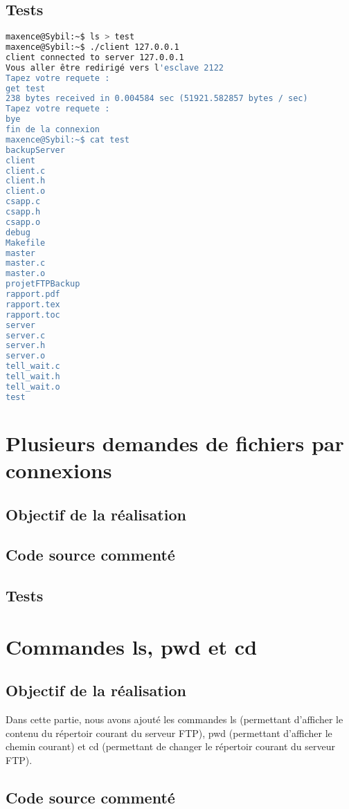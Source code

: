 \documentclass{report}
\begin{document}
      \section{Tests}
\begin{lstlisting}[frame=single,basicstyle=\footnotesize,language=bash]
maxence@Sybil:~$ ls > test
maxence@Sybil:~$ ./client 127.0.0.1
client connected to server 127.0.0.1
Vous aller être redirigé vers l'esclave 2122
Tapez votre requete :
get test
238 bytes received in 0.004584 sec (51921.582857 bytes / sec)
Tapez votre requete :
bye
fin de la connexion
maxence@Sybil:~$ cat test
backupServer
client
client.c
client.h
client.o
csapp.c
csapp.h
csapp.o
debug
Makefile
master
master.c
master.o
projetFTPBackup
rapport.pdf
rapport.tex
rapport.toc
server
server.c
server.h
server.o
tell_wait.c
tell_wait.h
tell_wait.o
test
\end{lstlisting}
    \chapter{Plusieurs demandes de fichiers par connexions}
      \section{Objectif de la r\'ealisation}

      \section{Code source comment\'e}
      \section{Tests}

    \chapter{Commandes ls, pwd et cd}
      \section{Objectif de la r\'ealisation}
	Dans cette partie, nous avons ajout\'e les commandes ls (permettant d'afficher le contenu du r\'epertoir courant du serveur FTP), pwd (permettant d'afficher le chemin courant) et cd (permettant de changer le r\'epertoir courant du serveur FTP). \\
      \section{Code source comment\'e}
\end{document}
